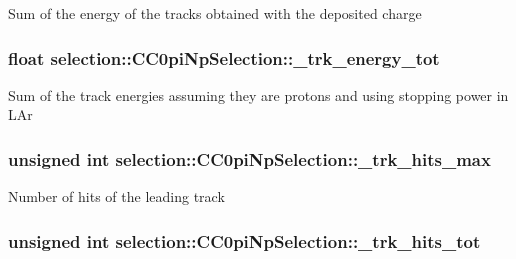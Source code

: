 Sum of the energy of the tracks obtained with the deposited charge \hypertarget{classselection_1_1CC0piNpSelection_a8a0da0081e2f182880249debba6551e3}{
\subsubsection[{\-\_\-trk\-\_\-energy\-\_\-tot}]{\setlength{\rightskip}{0pt plus 5cm}float selection\-::\-C\-C0pi\-Np\-Selection\-::\-\_\-trk\-\_\-energy\-\_\-tot\hspace{0.3cm}{\ttfamily [private]}}}\label{classselection_1_1CC0piNpSelection_a8a0da0081e2f182880249debba6551e3}
Sum of the track energies assuming they are protons and using stopping power in L\-Ar \hypertarget{classselection_1_1CC0piNpSelection_a247d186cb641d28f8ea5b02c4f2a39bc}{
\subsubsection[{\-\_\-trk\-\_\-hits\-\_\-max}]{\setlength{\rightskip}{0pt plus 5cm}unsigned int selection\-::\-C\-C0pi\-Np\-Selection\-::\-\_\-trk\-\_\-hits\-\_\-max\hspace{0.3cm}{\ttfamily [private]}}}\label{classselection_1_1CC0piNpSelection_a247d186cb641d28f8ea5b02c4f2a39bc}
Number of hits of the leading track \hypertarget{classselection_1_1CC0piNpSelection_a420b9962478d7998282e03f1ccf89c2e}{
\subsubsection[{\-\_\-trk\-\_\-hits\-\_\-tot}]{\setlength{\rightskip}{0pt plus 5cm}unsigned int selection\-::\-C\-C0pi\-Np\-Selection\-::\-\_\-trk\-\_\-hits\-\_\-tot\hspace{0.3cm}{\ttfamily [private]}}}\label{classselection_1_1CC0piNpSelection_a420b9962478d7998282e03f1ccf89c2e}
